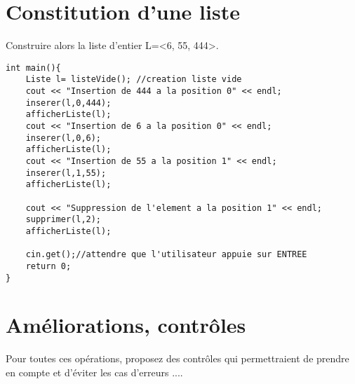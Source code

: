 \documentclass[french]{article}
\begin{document}
	\section{Constitution d’une liste}
	Construire alors la liste d’entier L=<6, 55, 444>.
	
	\begin{lstlisting}
int main(){
    Liste l= listeVide(); //creation liste vide
    cout << "Insertion de 444 a la position 0" << endl;
    inserer(l,0,444);
    afficherListe(l);
    cout << "Insertion de 6 a la position 0" << endl;
    inserer(l,0,6);
    afficherListe(l);
    cout << "Insertion de 55 a la position 1" << endl;
    inserer(l,1,55);
    afficherListe(l);
     
    cout << "Suppression de l'element a la position 1" << endl;
    supprimer(l,2);
    afficherListe(l);
     
    cin.get();//attendre que l'utilisateur appuie sur ENTREE
    return 0;	 
}
\end{lstlisting}
	
	\section{Améliorations, contrôles}
	Pour toutes ces opérations, proposez des contrôles qui permettraient de prendre en compte et d’éviter les cas d’erreurs ....
\end{document}
